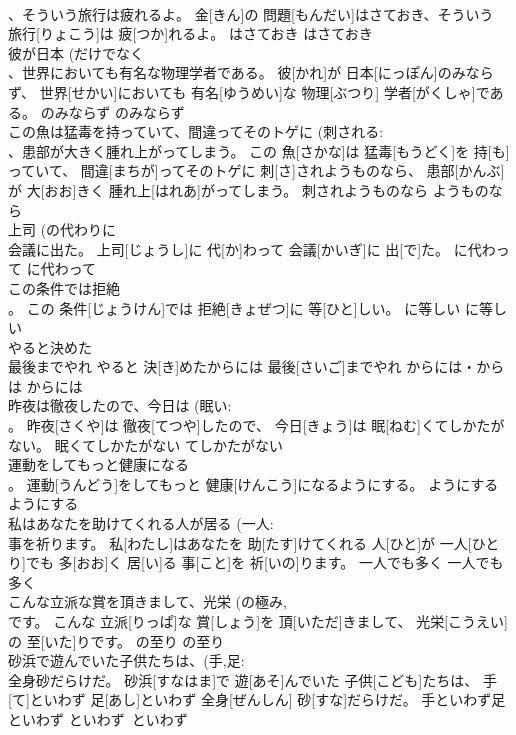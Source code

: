 \documentclass[8pt]{extreport}
\begin{document}
\begin{CJK}{UTF8}{min}
\\	、そういう旅行は疲れるよ。	金[きん]の 問題[もんだい]はさておき、そういう 旅行[りょこう]は 疲[つか]れるよ。	はさておき	はさておき	
\\	彼が日本 (だけでなく 
\\	、世界においても有名な物理学者である。	彼[かれ]が 日本[にっぽん]のみならず、 世界[せかい]においても 有名[ゆうめい]な 物理[ぶつり] 学者[がくしゃ]である。	のみならず	のみならず	
\\	この魚は猛毒を持っていて、間違ってそのトゲに (刺される: 
\\	、患部が大きく腫れ上がってしまう。	この 魚[さかな]は 猛毒[もうどく]を 持[も]っていて、 間違[まちが]ってそのトゲに 刺[さ]されようものなら、 患部[かんぶ]が 大[おお]きく 腫れ上[はれあ]がってしまう。	刺されようものなら	ようものなら	
\\	上司 (の代わりに 
\\	会議に出た。	上司[じょうし]に 代[か]わって 会議[かいぎ]に 出[で]た。	に代わって	に代わって	
\\	この条件では拒絶 
\\	。	この 条件[じょうけん]では 拒絶[きょぜつ]に 等[ひと]しい。	に等しい	に等しい	
\\	やると決めた 
\\	最後までやれ	やると 決[き]めたからには 最後[さいご]までやれ	からには・からは	からには	
\\	昨夜は徹夜したので、今日は (眠い: 
\\	。	昨夜[さくや]は 徹夜[てつや]したので、 今日[きょう]は 眠[ねむ]くてしかたがない。	眠くてしかたがない	てしかたがない	
\\	運動をしてもっと健康になる 
\\	。	運動[うんどう]をしてもっと 健康[けんこう]になるようにする。	ようにする	ようにする	
\\	私はあなたを助けてくれる人が居る (一人: 
\\	事を祈ります。	私[わたし]はあなたを 助[たす]けてくれる 人[ひと]が 一人[ひとり]でも 多[おお]く 居[い]る 事[こと]を 祈[いの]ります。	一人でも多く	一人でも多く	
\\	こんな立派な賞を頂きまして、光栄 (の極み, 
\\	です。	こんな 立派[りっぱ]な 賞[しょう]を 頂[いただ]きまして、 光栄[こうえい]の 至[いた]りです。	の至り	の至り	
\\	砂浜で遊んでいた子供たちは、(手,足: 
\\	全身砂だらけだ。	砂浜[すなはま]で 遊[あそ]んでいた 子供[こども]たちは、 手[て]といわず 足[あし]といわず 全身[ぜんしん] 砂[すな]だらけだ。	手といわず足といわず	といわず~といわず	

\end{CJK}
\end{document}
